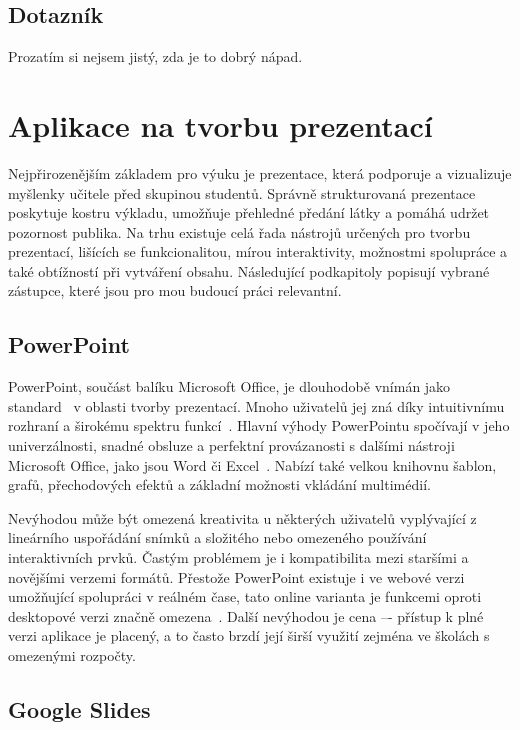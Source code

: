 \subsection{Dotazník}

Prozatím si nejsem jistý, zda je to dobrý nápad.

\section{Aplikace na tvorbu prezentací}

Nejpřirozenějším základem pro výuku je prezentace, která podporuje a vizualizuje myšlenky učitele před skupinou studentů.
Správně strukturovaná prezentace poskytuje kostru výkladu, umožňuje přehledné předání látky a pomáhá udržet pozornost publika.
Na trhu existuje celá řada nástrojů určených pro tvorbu prezentací, lišících se funkcionalitou, mírou interaktivity, možnostmi spolupráce a také obtížností při vytváření obsahu.
Následující podkapitoly popisují vybrané zástupce, které jsou pro mou budoucí práci relevantní.

\subsection{PowerPoint}

PowerPoint, součást balíku Microsoft Office, je dlouhodobě vnímán jako standard~\cite{pp_usage} v oblasti tvorby prezentací.
Mnoho uživatelů jej zná díky intuitivnímu rozhraní a širokému spektru funkcí~\cite{pp_usage}.
Hlavní výhody PowerPointu spočívají v jeho univerzálnosti, snadné obsluze a perfektní provázanosti s dalšími nástroji Microsoft Office, jako jsou Word či Excel~\cite{pp_excel, pp_word}.
Nabízí také velkou knihovnu šablon, grafů, přechodových efektů a základní možnosti vkládání multimédií.

Nevýhodou může být omezená kreativita u některých uživatelů vyplývající z lineárního uspořádání snímků a složitého nebo omezeného používání interaktivních prvků. 
Častým problémem je i kompatibilita mezi staršími a novějšími verzemi formátů.
Přestože PowerPoint existuje i ve webové verzi umožňující spolupráci v reálném čase, tato online varianta je funkcemi oproti desktopové verzi značně omezena~\cite{pp_platforms}.
Další nevýhodou je cena –- přístup k plné verzi aplikace je placený, a to často brzdí její širší využití zejména ve školách s omezenými rozpočty.

\subsection{Google Slides}

